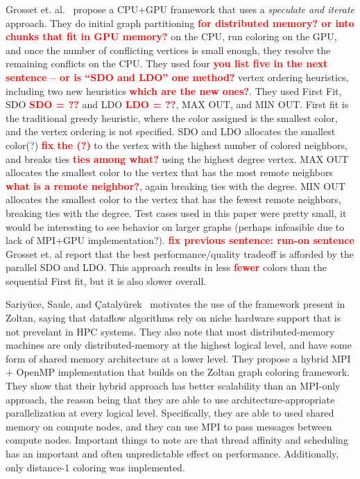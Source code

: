 \documentclass{article}
\newcommand{\todo}[1]{\textcolor{red}{\bf #1}}
\begin{document}
{{Grosset et. al.~\cite{grosset2011evaluating} propose a CPU+GPU framework that uses a 
{\it speculate and iterate} approach. They do initial graph partitioning \todo{for distributed memory? or into chunks that fit in GPU memory?} on the CPU, run coloring
on the GPU, and once the number of conflicting vertices is small enough, they resolve the remaining
conflicts on the CPU. They used four \todo{you list five in the next sentence -- or is ``SDO and LDO'' one method?} vertex ordering heuristics, including two new heuristics \todo{which are the new ones?}. They 
used First Fit, SDO \todo{SDO = ??} and LDO \todo{LDO = ??}, MAX OUT, and MIN OUT. First fit is the traditional greedy heuristic, where
the color assigned is the smallest color, and the vertex ordering is not specified. SDO and LDO 
allocates the smallest color(?) \todo{fix the (?)} to the vertex with the highest number of colored neighbors, and breaks
ties \todo{ties among what?} using the highest degree vertex. MAX OUT allocates the smallest color to the vertex that has the 
most remote neighbors \todo{what is a remote neighbor?}, again breaking ties with the degree. MIN OUT allocates the smallest color to the
vertex that has the fewest remote neighbors, breaking ties with the degree. 
Test cases used in this paper
were pretty small, it would be interesting to see behavior on larger graphs (perhaps infeasible due to
lack of MPI+GPU implementation?). \todo{fix previous sentence: run-on sentence}
Grosset et. al report that the best performance/quality tradeoff is
afforded by the parallel SDO and LDO. This approach results in less \todo{fewer} colors than the sequential First fit,
but it is also slower overall.

Sariy{\"u}ce, Saule, and {\c{C}}ataly{\"u}rek~\cite{sariyuce2012scalable} motivates the use of the
framework present in Zoltan, saying that dataflow algorithms rely on niche hardware support that is not
prevelant in HPC systems. They also note that most distributed-memory machines are only 
distributed-memory at the highest logical level, and have some form of shared memory architecture at a
lower level. They propose a hybrid MPI + OpenMP implementation that builds on the Zoltan graph coloring
framework. They show that their hybrid approach has better scalability than an MPI-only approach, the reason
being that they are able to use architecture-appropriate parallelization at every 
logical level. Specifically, they are able to used shared memory on compute nodes, and they can use
MPI to pass messages between compute nodes. Important things to note are that thread affinity and 
scheduling has an important and often unpredictable effect on performance. Additionally, only 
distance-1 coloring was implemented. 

}}
\end{document}

